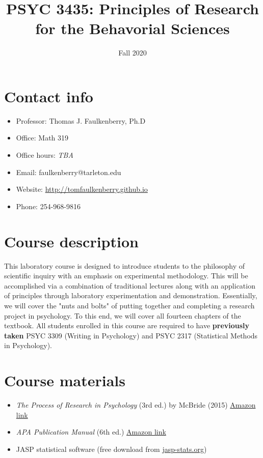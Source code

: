 \documentclass[10pt]{article}
\date{Fall 2020}
\title{PSYC 3435: Principles of Research for the Behavorial Sciences}
\begin{document}
\maketitle

\section*{Contact info}
\label{sec:org15843f2}
\begin{itemize}
\item Professor: Thomas J. Faulkenberry, Ph.D
\item Office: Math 319
\item Office hours: \emph{TBA}
\item Email: faulkenberry@tarleton.edu
\item Website: \url{http://tomfaulkenberry.github.io}
\item Phone: 254-968-9816
\end{itemize}

\section*{Course description}
\label{sec:org2abf13f}

This laboratory course is designed to introduce students to the philosophy of scientific inquiry with an emphasis on experimental methodology. This will be accomplished via a combination of traditional lectures along with an application of principles through laboratory experimentation and demonstration. Essentially, we will cover the "nuts and bolts" of putting together and completing a research project in psychology. To this end, we will cover all fourteen chapters of the textbook. All students enrolled in this course are required to have \textbf{previously taken} PSYC 3309 (Writing in Psychology) and PSYC 2317 (Statistical Methods in Psychology). 

\section*{Course materials}
\label{sec:org95ac33a}

\begin{itemize}
\item \emph{The Process of Research in Psychology} (3rd ed.) by McBride (2015) \href{https://www.amazon.com/Process-Research-Psychology-Dawn-McBride/dp/1483347605/}{Amazon link}
\item \emph{APA Publication Manual} (6th ed.) \href{https://www.amazon.com/Publication-Manual-American-Psychological-Association/dp/143383216X}{Amazon link}
\item JASP statistical software (free download from \href{http://jasp-stats.org}{jasp-stats.org})
\end{itemize}
\end{document}
